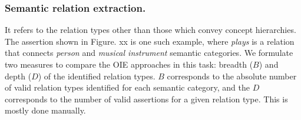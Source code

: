 \documentclass{llncs}
\begin{document}
\subsubsection{Semantic relation extraction.} It refers to the relation types other than those which convey concept hierarchies. The assertion shown in Figure. xx is one such example, where \textit{plays} is a relation that connects \textit{person} and \textit{musical instrument} semantic categories. We formulate two measures  to compare the OIE approaches in this task: breadth ($B$) and depth ($D$) of the identified relation types. $B$ corresponds to the absolute number of valid relation types identified for each semantic category, and the $D$ corresponds to the number of valid assertions for a given relation type. This is mostly done manually.
\begin{figure}[!b]
\label{fig:quant-carnatic}
\begin{center}
        \qquad
        \\
\end{center}
\end{figure}
\end{document}

